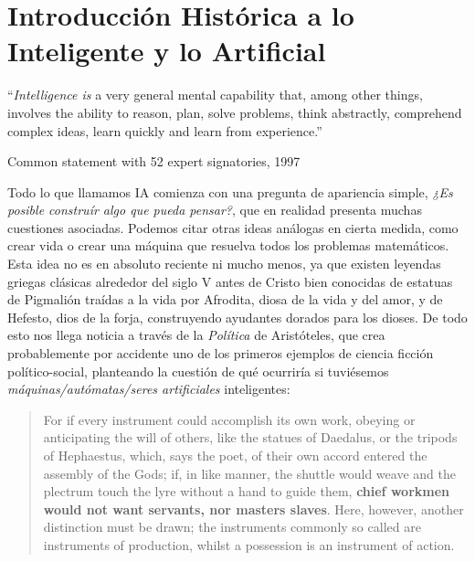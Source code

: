 \documentclass[12pt]{memoir}
\begin{document}
\newpage
\thispagestyle{empty}


\DoubleSpacing



\begin{KeepFromToc}
  \tableofcontents
\end{KeepFromToc}
\thispagestyle{empty}
\newpage

\pagestyle{fancy}
\fancyhf{}
\lhead[]{\thepage}
\rhead[\thepage]{}

\chapter{Introducción Histórica a lo Inteligente y lo Artificial}

\epigraph{``\textit{Intelligence is} a very general mental capability that, among other things, involves the ability to reason, plan, solve problems, think abstractly, comprehend complex ideas, learn quickly and learn from experience.''}{Common statement with 52 expert signatories, 1997}

Todo lo que llamamos IA comienza con una pregunta de apariencia simple, \textit{¿Es posible construír algo que pueda pensar?}, que en realidad presenta muchas cuestiones asociadas. Podemos citar otras ideas análogas en cierta medida, como crear vida o crear una máquina que resuelva todos los problemas matemáticos. Esta idea no es en absoluto reciente ni mucho menos, ya que existen leyendas griegas clásicas alrededor del siglo V antes de Cristo bien conocidas de estatuas de Pigmalión traídas a la vida por Afrodita, diosa de la vida y del amor, y de Hefesto, dios de la forja, construyendo ayudantes dorados para los dioses. De todo esto nos llega noticia a través de la \textit{Política} de Aristóteles, que crea probablemente por accidente uno de los primeros ejemplos de ciencia ficción político-social, planteando la cuestión de qué ocurriría si tuviésemos \textit{máquinas/autómatas/seres artificiales} inteligentes:

\blockquote{For if every instrument could accomplish its own work, obeying or anticipating the will of others, like the statues of Daedalus, or the tripods of Hephaestus, which, says the poet, of their own accord entered the assembly of the Gods; if, in like manner, the shuttle would weave and the plectrum touch the lyre without a hand to guide them, \textbf{chief workmen would not want servants, nor masters slaves}. Here, however, another distinction must be drawn; the instruments commonly so called are instruments of production, whilst a possession is an instrument of action. \parencite{aristotlePolitics}}
\end{document}
